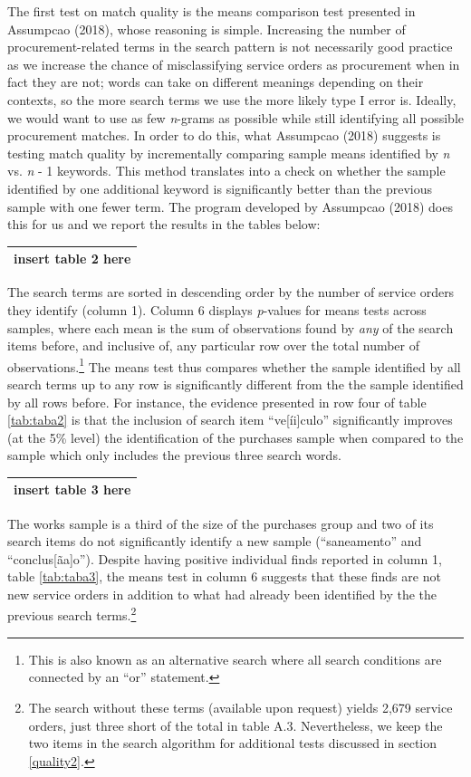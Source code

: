 \documentclass[]{article}
\let\rmarkdownfootnote\footnote%
\def\footnote{\protect\rmarkdownfootnote}
\theoremstyle{definition}
\theoremstyle{definition}
\theoremstyle{definition}
\theoremstyle{remark}
\begin{document}
The first test on match quality is the means comparison test presented
in Assumpcao (2018), whose reasoning is simple. Increasing the number of
procurement-related terms in the search pattern is not necessarily good
practice as we increase the chance of misclassifying service orders as
procurement when in fact they are not; words can take on different
meanings depending on their contexts, so the more search terms we use
the more likely type I error is. Ideally, we would want to use as few
\emph{n}-grams as possible while still identifying all possible
procurement matches. In order to do this, what Assumpcao (2018) suggests
is testing match quality by incrementally comparing sample means
identified by \emph{n} vs. \emph{n} - 1 keywords. This method translates
into a check on whether the sample identified by one additional keyword
is significantly better than the previous sample with one fewer term.
The program developed by Assumpcao (2018) does this for us and we report
the results in the tables below:

\begin{longtable}[]{@{}c@{}}
\toprule
\endhead
insert table 2 here\tabularnewline
\bottomrule
\end{longtable}

The search terms are sorted in descending order by the number of service
orders they identify (column 1). Column 6 displays \emph{p}-values for
means tests across samples, where each mean is the sum of observations
found by \emph{any} of the search items before, and inclusive of, any
particular row over the total number of observations.\footnote{This is
  also known as an alternative search where all search conditions are
  connected by an ``or'' statement.} The means test thus compares
whether the sample identified by all search terms up to any row is
significantly different from the the sample identified by all rows
before. For instance, the evidence presented in row four of table
\ref{tab:taba2} is that the inclusion of search item ``ve{[}íi{]}culo''
significantly improves (at the 5\% level) the identification of the
purchases sample when compared to the sample which only includes the
previous three search words.

\begin{longtable}[]{@{}c@{}}
\toprule
\endhead
insert table 3 here\tabularnewline
\bottomrule
\end{longtable}



The works sample is a third of the size of the purchases group and two
of its search items do not significantly identify a new sample
(``saneamento'' and ``conclus{[}ãa{]}o''). Despite having positive
individual finds reported in column 1, table \ref{tab:taba3}, the means
test in column 6 suggests that these finds are not new service orders in
addition to what had already been identified by the the previous search
terms.\footnote{The search without these terms (available upon request)
  yields 2,679 service orders, just three short of the total in table
  A.3. Nevertheless, we keep the two items in the search algorithm for
  additional tests discussed in section \ref{quality2}.}
\end{document}
